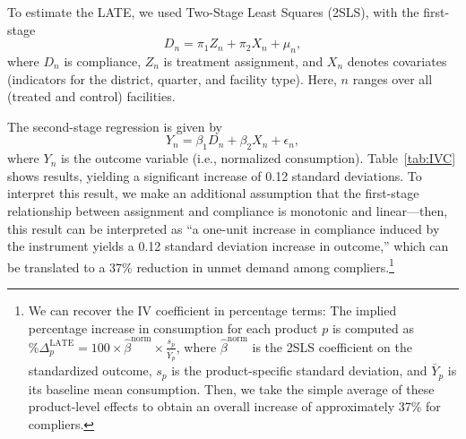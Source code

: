 \documentclass[12pt]{article}
\begin{document}
To estimate the LATE, we used Two-Stage Least Squares (2SLS), with the first-stage
\begin{equation}
\label{eq:first_stage}
D_n = \pi_1 Z_n + \pi_2 X_n + \mu_n,
\end{equation}
where $D_n$ is compliance, $Z_n$ is treatment assignment, and $X_n$ denotes covariates (indicators for the district, quarter, and facility type). Here, $n$ ranges over all (treated and control) facilities.

The second-stage regression is given by
\begin{equation} \label{eq:second_stage}
Y_n = \beta_1 D_n + \beta_2 X_n + \epsilon_n,
\end{equation}
where $Y_n$ is the outcome variable (i.e., normalized consumption). Table~\ref{tab:IVC} shows results, yielding a significant increase of 0.12 standard deviations. To interpret this result, we make an additional assumption that the first-stage relationship between assignment and compliance is monotonic and linear---then, this result can be interpreted as ``a one-unit increase in compliance induced by the instrument yields a 0.12 standard deviation increase in outcome,'' which can be translated to a 37\% reduction in unmet demand among compliers.\footnote{We can recover the IV coefficient in percentage terms: The implied percentage increase in consumption for each product $p$ is computed as $\%\Delta^{\text{LATE}}_p = 100 \times \hat{\beta}^{\text{norm}} \times \frac{s_p}{\bar{Y}_p}$, where $\hat{\beta}^{\text{norm}}$ is the 2SLS coefficient on the standardized outcome, $s_p$ is the product-specific standard deviation, and $\bar{Y}_p$ is its baseline mean consumption. Then, we take the simple average of these product-level effects to obtain an overall increase of approximately 37\% for compliers.}
\end{document}
